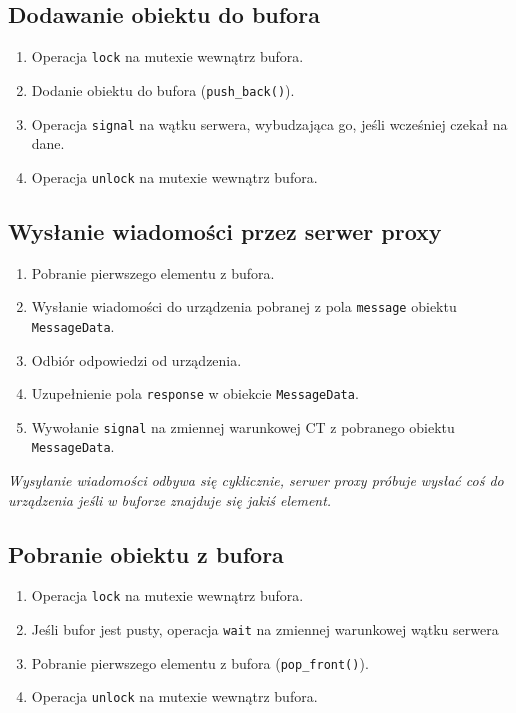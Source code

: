 \documentclass[a4paper]{article}
\begin{document}
\subsection{Dodawanie obiektu do bufora}
\begin{enumerate}
\item Operacja \texttt{lock} na mutexie wewnątrz bufora.
\item Dodanie obiektu do bufora (\texttt{push\_back()}).
\item Operacja \texttt{signal} na wątku serwera, wybudzająca go, jeśli wcześniej czekał na dane.
\item Operacja \texttt{unlock} na mutexie wewnątrz bufora.
\end{enumerate}

\subsection{Wysłanie wiadomości przez serwer proxy}
\begin{enumerate}
\item Pobranie pierwszego elementu z bufora.
\item Wysłanie wiadomości do urządzenia pobranej z pola \texttt{message} obiektu \texttt{MessageData}.
\item Odbiór odpowiedzi od urządzenia.
\item Uzupełnienie pola \texttt{response} w obiekcie \texttt{MessageData}.
\item Wywołanie \texttt{signal} na zmiennej warunkowej CT z pobranego obiektu \texttt{MessageData}.
\end{enumerate}

\textit{Wysyłanie wiadomości odbywa się cyklicznie, serwer proxy próbuje wysłać coś do urządzenia jeśli w buforze znajduje się jakiś element.}

\subsection{Pobranie obiektu z bufora}
\begin{enumerate}
\item Operacja \texttt{lock} na mutexie wewnątrz bufora.
\item Jeśli bufor jest pusty, operacja \texttt{wait} na zmiennej warunkowej wątku serwera
\item Pobranie pierwszego elementu z bufora (\texttt{pop\_front()}).
\item Operacja \texttt{unlock} na mutexie wewnątrz bufora.
\end{enumerate}
\end{document}
